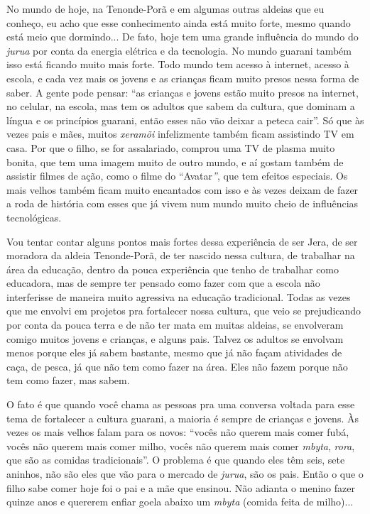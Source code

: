 No mundo de hoje, na Tenonde-Porã e em algumas outras aldeias que eu
conheço, eu acho que esse conhecimento ainda está muito forte, mesmo
quando está meio que dormindo... De fato, hoje tem uma grande influência
do mundo do \emph{jurua} por conta da energia elétrica e da tecnologia.
No mundo guarani também isso está ficando muito mais forte. Todo mundo
tem acesso à internet, acesso à escola, e cada vez mais os jovens e as
crianças ficam muito presos nessa forma de saber. A gente pode pensar:
``as crianças e jovens estão muito presos na internet, no celular, na
escola, mas tem os adultos que sabem da cultura, que dominam a língua e
os princípios guarani, então esses não vão deixar a peteca cair''. Só
que às vezes pais e mães, muitos \emph{xeramõi} infelizmente também
ficam assistindo TV em casa. Por que o filho, se for assalariado,
comprou uma TV de plasma muito bonita, que tem uma imagem muito de outro
mundo, e aí gostam também de assistir filmes de ação, como o filme do
``Avatar\emph{''}, que tem efeitos especiais. Os mais velhos também
ficam muito encantados com isso e às vezes deixam de fazer a roda de
história com esses que já vivem num mundo muito cheio de influências
tecnológicas.

Vou tentar contar alguns pontos mais fortes dessa experiência de ser
Jera, de ser moradora da aldeia Tenonde-Porã, de ter nascido nessa
cultura, de trabalhar na área da educação, dentro da pouca experiência
que tenho de trabalhar como educadora, mas de sempre ter pensado como
fazer com que a escola não interferisse de maneira muito agressiva na
educação tradicional. Todas as vezes que me envolvi em projetos pra
fortalecer nossa cultura, que veio se prejudicando por conta da pouca
terra e de não ter mata em muitas aldeias, se envolveram comigo muitos
jovens e crianças, e alguns pais. Talvez os adultos se envolvam menos
porque eles já sabem bastante, mesmo que já não façam atividades de
caça, de pesca, já que não tem como fazer na área. Eles não fazem porque
não tem como fazer, mas sabem.

O fato é que quando você chama as pessoas pra uma conversa voltada para
esse tema de fortalecer a cultura guarani, a maioria é sempre de
crianças e jovens. Às vezes os mais velhos falam para os novos: ``vocês
não querem mais comer fubá, vocês não querem mais comer milho, vocês não
querem mais comer \emph{mbyta}, \emph{rora}, que são as comidas
tradicionais''. O problema é que quando eles têm seis, sete aninhos, não
são eles que vão para o mercado de \emph{jurua}, são os pais. Então o
que o filho sabe comer hoje foi o pai e a mãe que ensinou. Não adianta o
menino fazer quinze anos e quererem enfiar goela abaixo um \emph{mbyta}
(comida feita de milho)...

